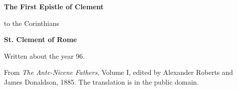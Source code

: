 \documentclass[11pt,letterpaper]{article}
\begin{document}
\color{ink}

\begin{titlepage}
\centering
\vspace*{4em}
{\LARGE\bfseries\color{heading} The First Epistle of Clement\par}
\vspace{1em}
{\large to the Corinthians\par}
\vspace{2em}
{\LARGE\bfseries\color{heading} St. Clement of Rome\par}
\vspace{3em}
{Written about the year 96.\par}
\vfill
{\small From \emph{The Ante-Nicene Fathers}, Volume I, edited by Alexander
Roberts and James Donaldson, 1885. The translation is in the public
domain.\par}
\vspace{2em}
\end{titlepage}

\tableofcontents
\clearpage


\end{document}
